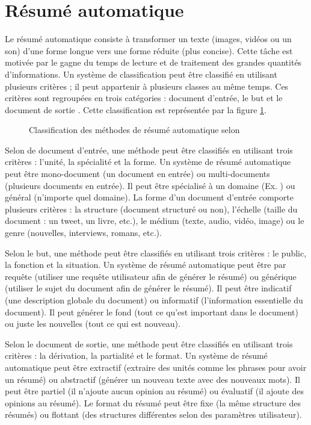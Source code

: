 \documentclass{KodeBook}
\begin{document}
\section{Résumé automatique}

Le résumé automatique consiste à transformer un texte (images, vidéos ou un son) d'une forme longue vers une forme réduite (plus concise).
Cette tâche est motivée par le gagne du temps de lecture et de traitement des grandes quantités d'informations.
Un système de classification peut être classifié en utilisant plusieurs critères ; il peut appartenir à plusieurs classes au même temps.
Ces critères sont regroupées en trois catégories : document d'entrée, le but et le document de sortie \cite{98-hovy-lin,99-sparckjones}.
Cette classification est représentée par la figure \ref{fig:ats-class}.

\begin{figure}[!ht]
	\centering
	\caption{Classification des méthodes de résumé automatique selon \cite{98-hovy-lin,99-sparckjones}}
	\label{fig:ats-class}
\end{figure}

Selon de document d'entrée, une méthode peut être classifiés en utilisant trois critères : l'unité, la spécialité et la forme. 
Un système de résumé automatique peut être mono-document (un document en entrée) ou multi-documents (plusieurs documents en entrée). 
Il peut être spécialisé à un domaine (Ex. ) ou général (n'importe quel domaine).
La forme d'un document d'entrée comporte plusieurs critères : la structure (document structuré ou non), l'échelle (taille du document : un tweet, un livre, etc.), le médium (texte, audio, vidéo, image) ou le genre (nouvelles, interviews, romans, etc.).

Selon le but, une méthode peut être classifiés en utilisant trois critères : le public, la fonction et la situation. 
Un système de résumé automatique peut être par requête (utiliser une requête utilisateur afin de générer le résumé) ou générique (utiliser le sujet du document afin de générer le résumé).
Il peut être indicatif (une description globale du document) ou informatif (l'information essentielle du document). 
Il peut générer le fond (tout ce qu'est important dans le document) ou juste les nouvelles (tout ce qui est nouveau).

Selon le document de sortie, une méthode peut être classifiés en utilisant trois critères : la dérivation, la partialité et le format.
Un système de résumé automatique peut être extractif (extraire des unités comme les phrases pour avoir un résumé) ou abstractif (générer un nouveau texte avec des nouveaux mots).
Il peut être partiel (il n'ajoute aucun opinion au résumé) ou évaluatif (il ajoute des opinions au résumé).
Le format du résumé peut être fixe (la même structure des résumés) ou flottant (des structures différentes selon des paramètres utilisateur).
\end{document}
